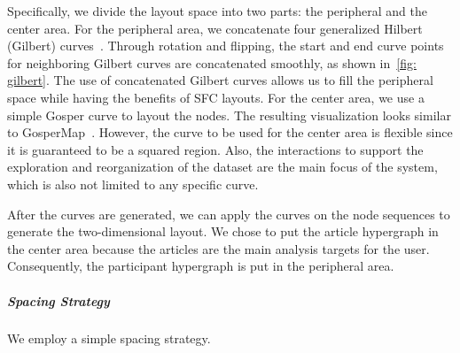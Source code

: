 Specifically, we divide the layout space into two parts: the peripheral and the center area.
For the peripheral area, we concatenate four generalized Hilbert (Gilbert) curves~\cite{gilbert}.
Through rotation and flipping, the start and end curve points for neighboring Gilbert curves are concatenated smoothly, as shown in~\autoref{fig: gilbert}.
The use of concatenated Gilbert curves allows us to fill the peripheral space while having the benefits of SFC layouts.
For the center area, we use a simple Gosper curve to layout the nodes.
The resulting visualization looks similar to GosperMap~\cite{auber2013gospermap}.
However, the curve to be used for the center area is flexible since it is guaranteed to be a squared region.
Also, the interactions to support the exploration and reorganization of the dataset are the main focus of the system, which is also not limited to any specific curve.

After the curves are generated, we can apply the curves on the node sequences to generate the two-dimensional layout.
We chose to put the article hypergraph in the center area because the articles are the main analysis targets for the user.
Consequently, the participant hypergraph is put in the peripheral area.
\subparagraph{Spacing Strategy}
We employ a simple spacing strategy.

